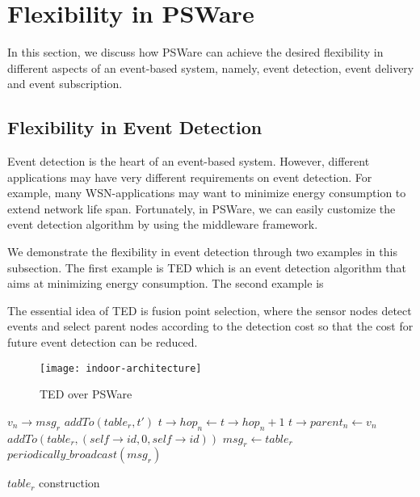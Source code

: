 \section{Flexibility in PSWare}
In this section, we discuss how PSWare can achieve the desired flexibility in different aspects of an event-based system, namely, event detection, event delivery and event subscription.

\subsection{Flexibility in Event Detection}
Event detection is the heart of an event-based system. However, different applications may have very different requirements on event detection. For example, many WSN-applications may want to minimize energy consumption to extend network life span. Fortunately, in PSWare, we can easily customize the event detection algorithm by using the middleware framework.

We demonstrate the flexibility in event detection through two examples in this subsection. The first example is TED \cite{lai:ted} which is an event detection algorithm that aims at minimizing energy consumption. The second example is 

The essential idea of TED is fusion point selection, where the sensor nodes detect events and select parent nodes according to the detection cost so that the cost for future event detection can be reduced.

\begin{figure}
\centering
\texttt{[image: indoor-architecture]}
\caption{TED over PSWare}
\label{fig:ted-architecture}
\end{figure}

\begin{algorithm}
\begin{algorithmic}
\REQUIRE \(v_n\rightarrow msg_r\)
			\STATE \(addTo(table_r, t')\)
		\ENDIF
					\STATE \(t\rightarrow hop_n \gets t\rightarrow hop_n+1\)
					\STATE \(t\rightarrow parent_n \gets v_n\)
				\ENDIF
			\ENDIF
		\ENDFOR
	\ENDFOR
		\STATE \(addTo(table_r, (self\rightarrow id, 0, self\rightarrow id))\)
	\ENDIF
	\STATE \(msg_r \gets table_r\)
	\STATE \(periodically\_broadcast(msg_r)\)
\end{algorithmic}
\caption{\(table_r\) construction}
\label{algo:table_r}
\end{algorithm}

